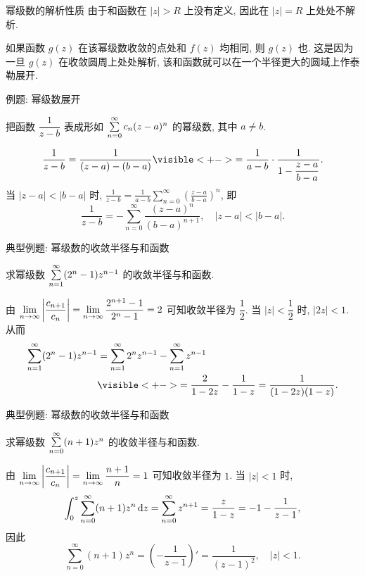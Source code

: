 \begin{frame}{幂级数的解析性质}
\onslide<+->
由于和函数在 $|z|>R$ 上没有定义, 因此在 $|z|=R$ 上处处不解析.

\onslide<+->
如果函数 $g(z)$ 在该幂级数收敛的点处和 $f(z)$ 均相同, 则 $g(z)$ 也.
\onslide<+->
这是因为一旦 $g(z)$ 在收敛圆周上处处解析, 该和函数就可以在一个半径更大的圆域上作泰勒展开.
\end{frame}


\begin{frame}{例题: 幂级数展开}
\begin{example}
把函数 $\dfrac1{z-b}$ 表成形如 $\sum\limits_{n=0}^\infty c_n(z-a)^n$ 的幂级数, 其中 $a\neq b$.
\end{example}
\begin{solution}
\[\frac1{z-b}=\frac1{(z-a)-(b-a)}
\visible<+->{=\frac1{a-b}\cdot\frac1{1-\dfrac{z-a}{b-a}}.}\]
\onslide<+->
当 $|z-a|<|b-a|$ 时,
\onslide<+->
$\displaystyle\frac1{z-b}=\frac1{a-b}\sum_{n=0}^\infty\left(\frac{z-a}{b-a}\right)^n$,
\onslide<+->
即
\[\frac1{z-b}=-\sum_{n=0}^\infty\frac{(z-a)^n}{(b-a)^{n+1}},\quad|z-a|<|b-a|.\]
\vspace{-3pt}
\end{solution}
\end{frame}


\begin{frame}{典型例题: 幂级数的收敛半径与和函数}
\begin{example}
求幂级数 $\sum\limits_{n=1}^\infty(2^n-1)z^{n-1}$ 的收敛半径与和函数.
\end{example}
\begin{solution}
由 $\displaystyle\lim_{n\to\infty}\left|\frac{c_{n+1}}{c_n}\right|=\lim_{n\to\infty}\frac{2^{n+1}-1}{2^n-1}=2$ 可知收敛半径为 $\dfrac12$.
\onslide<+->
当 $|z|<\dfrac12$ 时, $|2z|<1$.
\onslide<+->
从而
\begin{align*}
\sum_{n=1}^\infty(2^n-1)z^{n-1}&=\sum_{n=1}^\infty 2^n z^{n-1}-\sum_{n=1}^\infty z^{n-1}\\
&\visible<+->{=\frac2{1-2z}-\frac1{1-z}=\frac1{(1-2z)(1-z)}.}
\end{align*}
\end{solution}
\end{frame}


\begin{frame}{典型例题: 幂级数的收敛半径与和函数}
\begin{example}
求幂级数 $\sum\limits_{n=0}^\infty(n+1)z^n$ 的收敛半径与和函数.
\end{example}
\begin{solution}
由 $\displaystyle\lim_{n\to\infty}\left|\frac{c_{n+1}}{c_n}\right|=\lim_{n\to\infty}\frac{n+1}n=1$ 可知收敛半径为 $1$.
\onslide<+->
当 $|z|<1$ 时,
\[\int_0^z\sum_{n=0}^\infty(n+1)z^n\,\mathrm{d} z=\sum_{n=0}^\infty z^{n+1}=\frac z{1-z}=-1-\frac1{z-1},\]
\onslide<+->
因此
\[\sum_{n=0}^\infty(n+1)z^n=\left(-\frac1{z-1}\right)'=\frac1{(z-1)^2},\quad |z|<1.\]
\vspace{-\baselineskip}
\end{solution}
\end{frame}


